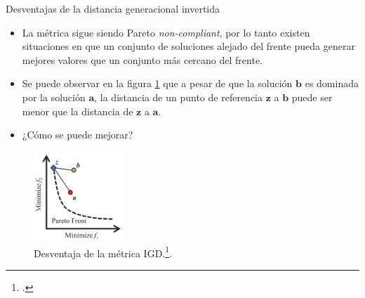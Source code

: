 \documentclass{beamer}
\begin{document}
\begin{frame}{Desventajas de la distancia generacional invertida}
\begin{itemize}
\justifying
\scriptsize
\item La métrica sigue siendo Pareto \textit{non-compliant}, por lo tanto existen situaciones en que un conjunto de soluciones alejado del frente pueda generar mejores valores que un conjunto más cercano del frente.
\item Se puede observar en la figura \ref{fig:igd_fail} que a pesar de que la solución $\boldsymbol{b}$ es dominada por la solución $\boldsymbol{a}$, la distancia de un punto de referencia $\boldsymbol{z}$ a $\boldsymbol{b}$ puede ser menor que la distancia de $\boldsymbol{z}$ a $\boldsymbol{a}$.
\item ¿Cómo se puede mejorar?
\end{itemize}
\begin{figure}[H]
\centering
\includegraphics[width=0.3\textwidth]{Images/igd_2.png}
\caption{\scriptsize Desventaja de la métrica IGD.\footcite{ishibuchi2016sensitivity}.} \label{fig:igd_fail}
\end{figure}
\end{frame}
\end{document}
